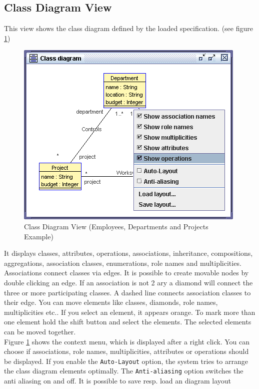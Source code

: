 \documentclass[a4paper,titlepage,oneside,final]{scrreprt} %
\begin{document}
\subsection{Class Diagram View}\label{classdiagramview}
This view shows the class diagram defined by the loaded specification. (see figure \ref{fig:ClassDiagramView})
\begin{figure}[ht]
\centering
\includegraphics[scale=0.7]{Screenshots/GUI/Views/ClassDiagramView.png}
\caption{Class Diagram View (Employees, Departments and Projects Example)}
\label{fig:ClassDiagramView}
\end{figure}
It displays classes, attributes, operations, associations, inheritance, compositions, aggregations,
association classes, enumerations, role names and multiplicities.
Associations connect classes via edges. It is possible to create movable nodes
by double clicking an edge.
If an association is not 2 ary a diamond will connect the three or more participating classes.
A dashed line connects association classes to their edge.
You can move elements like classes, diamonds, role names, multiplicities
etc.. If you select an element, it appears orange. To mark
more than one element hold the shift button and select
the elements. The selected elements can be moved together.\\
Figure \ref{fig:ClassDiagramView} shows the context menu, which is
displayed after a right click. You can choose
if associations, role names, multiplicities, attributes
or operations should be displayed.
If you enable the \verb+Auto-Layout+ option, the system
tries to arrange the class diagram elements optimally.
The \verb+Anti-aliasing+ option switches the anti aliasing on
and off. It is possible to save resp. load an diagram layout
\end{document}
